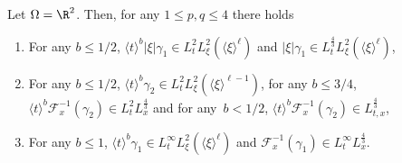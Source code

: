 \begin{lemm}\label{lem:gamma&tildegammaR2}
Let $\Omega = \R^2$. Then, for any $1 \le p, q \le 4$ there holds
\begin{enumerate}\romanenumi
\item \label{listlemmB9.1}For any $b \le 1/2$, $\langle t \rangle^b |\xi| \gamma_1 \in L^2_tL^2_\xi(\langle \xi \rangle^\ell) $ and $ |\xi| \gamma_1 \in L^{\frac43}_tL^2_\xi(\langle \xi \rangle^\ell)$,
\item \label{listlemmB9.2}For any $b\le 1/2$, $\langle t \rangle^b \gamma_2 \in L^2_t L^2_\xi(\langle \xi \rangle^{\ell-1}) $, for any $b \le 3/4$, $\langle t \rangle^b \mathcal{F}_x^{-1}(\gamma_2) \in L^2_t L^{\frac43}_x$ and for any~$b<1/2$, $\langle t \rangle^b \mathcal{F}_x^{-1}(\gamma_2) \in L^{\frac43}_{t,x}$,
\item \label{listlemmB9.3}For any $b \le 1$, $\langle t \rangle^b \gamma_1 \in L^\infty_tL^2_\xi(\langle \xi \rangle^\ell)$ and $ \mathcal{F}_x^{-1}(\gamma_1) \in L^\infty_t L^{\frac43}_x$.
\end{enumerate}

\end{lemm}
